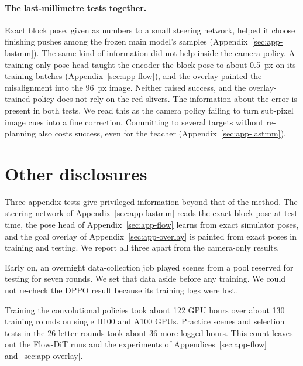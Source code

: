 \documentclass[10pt,twocolumn,letterpaper]{article}
\begin{document}
\paragraph{The last-millimetre tests together.}
Exact block pose, given as numbers to a small steering network, helped it choose finishing pushes among the frozen
main model's samples (Appendix~\ref{sec:app-lastmm}). The same kind of information did not help inside the camera
policy. A training-only pose head taught the encoder the block pose to about 0.5~px on its training batches
(Appendix~\ref{sec:app-flow}), and the overlay painted the misalignment into the 96~px image. Neither raised success,
and the overlay-trained policy does not rely on the red slivers. The information about the error is present in both
tests. We read this as the camera policy failing to turn sub-pixel image cues into a fine correction. Committing to
several targets without re-planning also costs success, even for the teacher (Appendix~\ref{sec:app-lastmm}).

\section{Other disclosures}
\label{sec:app-disclosure}

Three appendix tests give privileged information beyond that of the method. The steering network of
Appendix~\ref{sec:app-lastmm} reads the exact block pose at test time, the pose head of Appendix~\ref{sec:app-flow}
learns from exact simulator poses, and the goal overlay of Appendix~\ref{sec:app-overlay} is painted from exact poses
in training and testing. We report all three apart from the camera-only results.

Early on, an overnight data-collection job played scenes from a pool reserved for testing for seven rounds. We set
that data aside before any training. We could not re-check the DPPO result because its training logs were lost.

Training the convolutional policies took about 122 GPU hours over about 130 training rounds on single H100 and A100
GPUs. Practice scenes and selection tests in the 26-letter rounds took about 36 more logged hours. This count leaves
out the Flow-DiT runs and the experiments of Appendices~\ref{sec:app-flow} and~\ref{sec:app-overlay}.

\FloatBarrier
\end{document}
